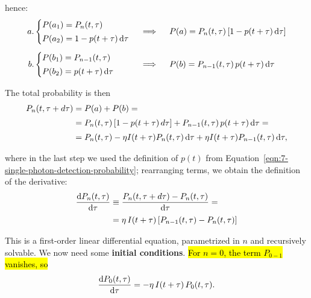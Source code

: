 hence:
\begin{equation}\label{eqn:7-photon-statistics-probabilities}
\begin{alignedat}{3}
    a&.
    \begin{cases}
        P(a_1) = P_n(t,\tau)\\[0.5ex]
        P(a_2) = 1 - p(t+\tau)\,\mathrm{d}\tau
    \end{cases}
    &&\implies\quad 
    P(a) = P_n(t,\tau) \left[1 - p(t+\tau)\,\mathrm{d}\tau\right]
    \\[1ex]
    b&.
    \begin{cases}
        P(b_1) = P_{n-1}(t,\tau)\\[0.5ex]
        P(b_2) = p(t+\tau)\,\mathrm{d}\tau
    \end{cases}
    &&\implies\quad 
    P(b) = P_{n-1}(t,\tau)\,p(t+\tau)\,\mathrm{d}\tau
\end{alignedat}
\end{equation}

The total probability is then
\begin{equation}\label{eqn:7-photon-statistics-total-probability}
\begin{split}
    P_n(t,\tau+d\tau) 
    &= P(a) + P(b) = \\[0.5ex]
    &= P_n(t,\tau)\,[1-p(t+\tau)\,d\tau] + 
    P_{n-1}(t,\tau)\,p(t+\tau)\,\mathrm{d}\tau = \\[0.5ex]
    &= P_n(t,\tau) - \eta I(t+\tau)P_n(t,\tau)\,\mathrm{d}\tau +
    \eta I(t+\tau)P_{n-1}(t,\tau)\,\mathrm{d}\tau,
\end{split}
\end{equation}

where in the last step we used the definition of $p(t)$ from Equation~\ref{eqn:7-single-photon-detection-probability}; rearranging terms, we obtain the definition of the derivative:
\begin{equation}\label{eqn:7-photon-statistics-differential-equation}
\begin{split}
    \odv{P_n(t,\tau)}{\tau} &\equiv
    \frac{P_n(t,\tau+d\tau) - P_n(t,\tau)}{\d\tau} =\\[0.5ex]
    &= \eta\,I(t+\tau)\,[P_{n-1}(t,\tau)-P_n(t,\tau)]
\end{split}
\end{equation}

This is a first-order linear differential equation, parametrized in $n$ and recursively solvable. We now need some \textbf{initial conditions}. \hl{For $n=0$, the term $P_{0-1}$ vanishes, so}
\begin{equation}\label{eqn:7-photon-statistics-differential-equation-n0}
\odv{P_0(t,\tau)}{\tau}=-\eta\,I(t+\tau)\,P_0(t,\tau).
\end{equation}

